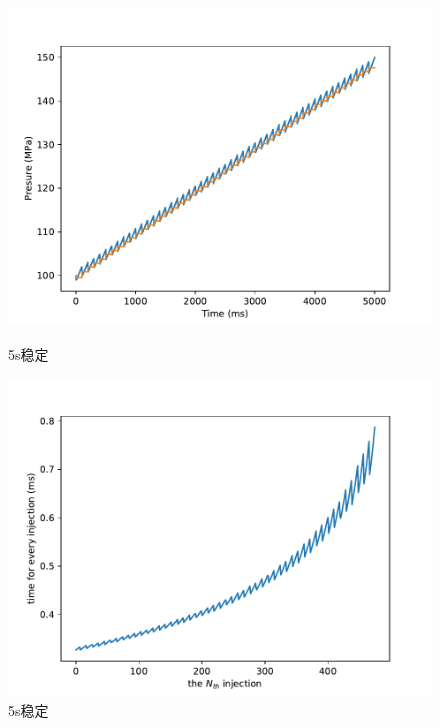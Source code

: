 \documentclass{cumcmthesis}
\begin{document}
\begin{figure}[htbp]
\begin{minipage}[t]{0.48\textwidth}
        \includegraphics[scale=0.45]{5000.pdf}
        \caption{5s稳定}
        \label{5000}
    \end{minipage}
    \begin{minipage}[t]{0.48\textwidth}
        \centering
        \includegraphics[scale=.45]{5000t.pdf}
        \caption{5s稳定}
        \label{5000t}
    \end{minipage}
    \begin{minipage}[t]{0.48\textwidth}
        \centering

\end{minipage}
\end{figure}
\end{document}
